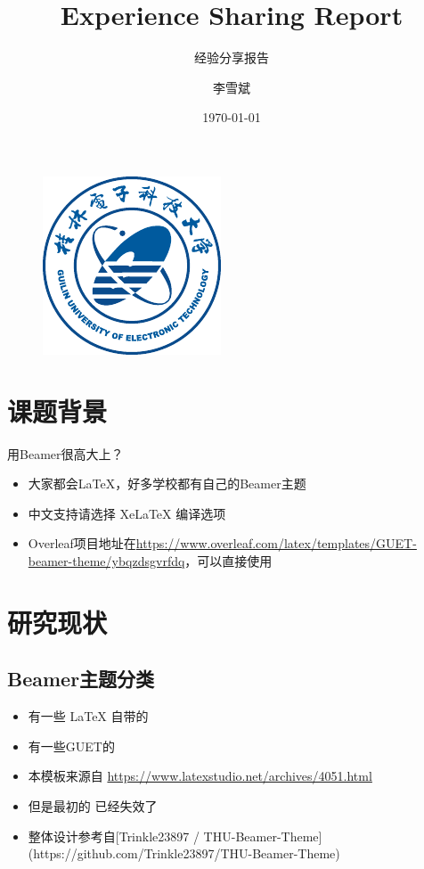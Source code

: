 \documentclass{beamer}
\author{李雪斌}
\title{Experience Sharing Report}
\subtitle{经验分享报告}
\institute{先进电子制造技术创新工艺研究所}
\date{\today}
\begin{document}
\kaishu
\begin{frame}
    \titlepage
    \begin{figure}[htpb]
        \begin{center}
            \includegraphics[width=0.2\linewidth]{Guet-logo.pdf}
        \end{center}
    \end{figure}
\end{frame}

\begin{frame}
    \tableofcontents[sectionstyle=show,subsectionstyle=show/shaded/hide,subsubsectionstyle=show/shaded/hide]
\end{frame}


\section{课题背景}

\begin{frame}{用Beamer很高大上？}
    \begin{itemize}[<+-| alert@+>] %
        \item 大家都会\LaTeX{}，好多学校都有自己的Beamer主题
        \item 中文支持请选择 Xe\LaTeX{} 编译选项
        \item Overleaf项目地址在\url{https://www.overleaf.com/latex/templates/GUET-beamer-theme/ybqzdsgvrfdq}，可以直接使用
    \end{itemize}
\end{frame}


\section{研究现状}

\subsection{Beamer主题分类}

\begin{frame}
    \begin{itemize}
        \item 有一些 \LaTeX{} 自带的
        \item 有一些GUET的
        \item 本模板来源自 \newline \url{https://www.latexstudio.net/archives/4051.html}
        \item 但是最初的 \href{http://far.tooold.cn/post/latex/beamerdlut}{\color{purple}{link}} \cite{origin}已经失效了
        \item 整体设计参考自[Trinkle23897 / THU-Beamer-Theme](https://github.com/Trinkle23897/THU-Beamer-Theme)
    \end{itemize}
\end{frame}
\end{document}

